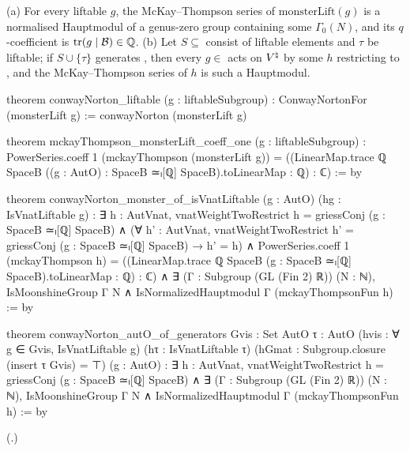 \begin{theorem}\label{ch21:thm:cnLiftable}
(a) For every liftable $g$, the McKay--Thompson series of $\mathrm{monsterLift}(g)$ is a normalised
Hauptmodul of a genus-zero group containing some $\Gamma_0(N)$, and its $q$-coefficient is
$\operatorname{tr}(g\mid\mathcal{B})\in{\mathbb{Q}}$.
(b) Let $S\subseteq$  consist of liftable elements and $\tau$ be liftable; if $S\cup\{\tau\}$
generates , then every $g\in$  acts on ${V^{\natural}}$ by some $h$ restricting to
, and the McKay--Thompson series of $h$ is such a Hauptmodul.
\end{theorem}
\begin{leancode}
theorem conwayNorton_liftable (g : liftableSubgroup) : ConwayNortonFor (monsterLift g) :=
  conwayNorton (monsterLift g)
\end{leancode}
\begin{leancode}
theorem mckayThompson_monsterLift_coeff_one (g : liftableSubgroup) :
    PowerSeries.coeff 1 (mckayThompson (monsterLift g))
      = ((LinearMap.trace ℚ SpaceB ((g : AutO) : SpaceB ≃ₗ[ℚ] SpaceB).toLinearMap : ℚ) : ℂ) := by
\end{leancode}
\begin{leancode}
theorem conwayNorton_monster_of_isVnatLiftable (g : AutO) (hg : IsVnatLiftable g) :
    ∃ h : AutVnat, vnatWeightTwoRestrict h = griessConj (g : SpaceB ≃ₗ[ℚ] SpaceB) ∧
      (∀ h' : AutVnat, vnatWeightTwoRestrict h' = griessConj (g : SpaceB ≃ₗ[ℚ] SpaceB) → h' = h) ∧
      PowerSeries.coeff 1 (mckayThompson h)
        = ((LinearMap.trace ℚ SpaceB (g : SpaceB ≃ₗ[ℚ] SpaceB).toLinearMap : ℚ) : ℂ) ∧
      ∃ (Γ : Subgroup (GL (Fin 2) ℝ)) (N : ℕ), IsMoonshineGroup Γ N ∧
        IsNormalizedHauptmodul Γ (mckayThompsonFun h) := by
\end{leancode}
\begin{leancode}
theorem conwayNorton_autO_of_generators {Gvis : Set AutO} {τ : AutO}
    (hvis : ∀ g ∈ Gvis, IsVnatLiftable g) (hτ : IsVnatLiftable τ)
    (hGmat : Subgroup.closure (insert τ Gvis) = ⊤) (g : AutO) :
    ∃ h : AutVnat, vnatWeightTwoRestrict h = griessConj (g : SpaceB ≃ₗ[ℚ] SpaceB) ∧
      ∃ (Γ : Subgroup (GL (Fin 2) ℝ)) (N : ℕ), IsMoonshineGroup Γ N ∧
        IsNormalizedHauptmodul Γ (mckayThompsonFun h) := by
\end{leancode}
(.)
